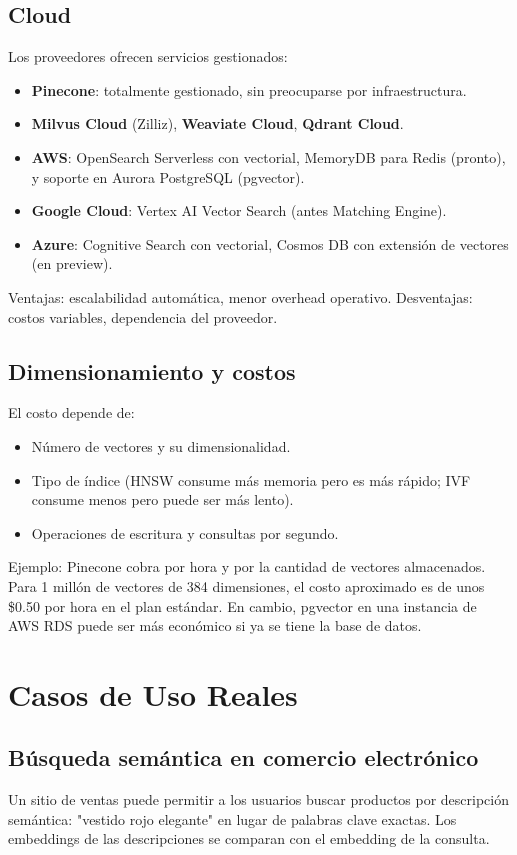 \documentclass[12pt,a4paper,openany,oneside]{book}
\begin{document}
\section{Cloud}
Los proveedores ofrecen servicios gestionados:
\begin{itemize}
    \item \textbf{Pinecone}: totalmente gestionado, sin preocuparse por infraestructura.
    \item \textbf{Milvus Cloud} (Zilliz), \textbf{Weaviate Cloud}, \textbf{Qdrant Cloud}.
    \item \textbf{AWS}: OpenSearch Serverless con vectorial, MemoryDB para Redis (pronto), y soporte en Aurora PostgreSQL (pgvector).
    \item \textbf{Google Cloud}: Vertex AI Vector Search (antes Matching Engine).
    \item \textbf{Azure}: Cognitive Search con vectorial, Cosmos DB con extensión de vectores (en preview).
\end{itemize}
Ventajas: escalabilidad automática, menor overhead operativo. Desventajas: costos variables, dependencia del proveedor.

\section{Dimensionamiento y costos}
El costo depende de:
\begin{itemize}
    \item Número de vectores y su dimensionalidad.
    \item Tipo de índice (HNSW consume más memoria pero es más rápido; IVF consume menos pero puede ser más lento).
    \item Operaciones de escritura y consultas por segundo.
\end{itemize}
Ejemplo: Pinecone cobra por hora y por la cantidad de vectores almacenados. Para 1 millón de vectores de 384 dimensiones, el costo aproximado es de unos \$0.50 por hora en el plan estándar. En cambio, pgvector en una instancia de AWS RDS puede ser más económico si ya se tiene la base de datos.

\chapter{Casos de Uso Reales}
\section{Búsqueda semántica en comercio electrónico}
Un sitio de ventas puede permitir a los usuarios buscar productos por descripción semántica: "vestido rojo elegante" en lugar de palabras clave exactas. Los embeddings de las descripciones se comparan con el embedding de la consulta.
\end{document}
